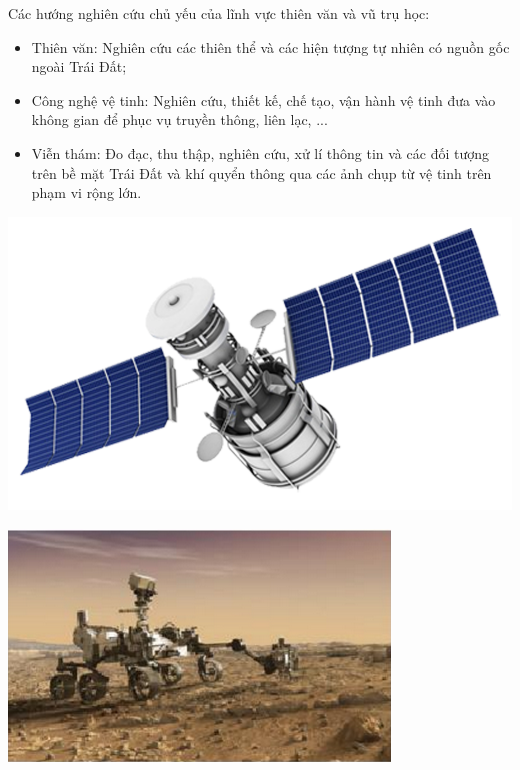 \begin{minipage}[l]{0.6\textwidth}
Các hướng nghiên cứu chủ yếu của lĩnh vực thiên văn và vũ trụ học:
\begin{itemize}
	\item Thiên văn: Nghiên cứu các thiên thể và các hiện tượng tự nhiên có nguồn gốc ngoài Trái Đất;
	\item Công nghệ vệ tinh: Nghiên cứu, thiết kế, chế tạo, vận hành vệ tinh đưa vào không gian để phục vụ truyền thông, liên lạc, ...
	\item Viễn thám: Đo đạc, thu thập, nghiên cứu, xử lí thông tin và các đối tượng trên bề mặt Trái Đất và khí quyển thông qua các ảnh chụp từ vệ tinh trên phạm vi rộng lớn.
\end{itemize}
\end{minipage}
\begin{minipage}[r]{0.4\textwidth}
\begin{center}
	\includegraphics[scale=0.1]{../figs/G10-002-2.png}
\end{center}
\begin{center}
	\includegraphics[scale=0.7]{../figs/G10-002-3.png}
\end{center}
\end{minipage}


